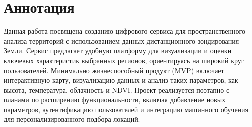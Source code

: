\chapter*{Аннотация}
Данная работа посвящена созданию цифрового сервиса для пространственного анализа территорий с использованием данных дистанционного зондирования Земли. Сервис предлагает удобную платформу для визуализации и оценки ключевых характеристик выбранных регионов, ориентируясь на широкий круг пользователей. Минимально жизнеспособный продукт (MVP) включает интерактивную карту, визуализацию данных и анализ таких параметров, как высота, температура, облачность и NDVI. Проект реализуется поэтапно с планами по расширению функциональности, включая добавление новых параметров, аутентификацию пользователей и интеграцию машинного обучения для персонализированного подбора локаций.